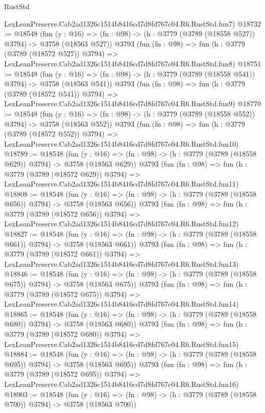\begin{lexlean}{RustStd}
\begin{coremodule}
    LexLeanPreserve.Cab2ad1326c1514b8416cd7d8fd767c04.R6.RustStd.fun7)
@18732 := @18548
    (fun (y : @16) => (fn : @98) -> (h : @3779 (@3789 (@18558 @527)) @3794) -> @3758 (@18563 @527))
    @3793
    (fun (fn : @98) =>
    fun (h : @3779 (@3789 (@18572 @527)) @3794) =>
    LexLeanPreserve.Cab2ad1326c1514b8416cd7d8fd767c04.R6.RustStd.fun8)
@18751 := @18548
    (fun (y : @16) => (fn : @98) -> (h : @3779 (@3789 (@18558 @541)) @3794) -> @3758 (@18563 @541))
    @3793
    (fun (fn : @98) =>
    fun (h : @3779 (@3789 (@18572 @541)) @3794) =>
    LexLeanPreserve.Cab2ad1326c1514b8416cd7d8fd767c04.R6.RustStd.fun9)
@18770 := @18548
    (fun (y : @16) => (fn : @98) -> (h : @3779 (@3789 (@18558 @552)) @3794) -> @3758 (@18563 @552))
    @3793
    (fun (fn : @98) =>
    fun (h : @3779 (@3789 (@18572 @552)) @3794) =>
    LexLeanPreserve.Cab2ad1326c1514b8416cd7d8fd767c04.R6.RustStd.fun10)
@18789 := @18548
    (fun (y : @16) => (fn : @98) -> (h : @3779 (@3789 (@18558 @629)) @3794) -> @3758 (@18563 @629))
    @3793
    (fun (fn : @98) =>
    fun (h : @3779 (@3789 (@18572 @629)) @3794) =>
    LexLeanPreserve.Cab2ad1326c1514b8416cd7d8fd767c04.R6.RustStd.fun11)
@18808 := @18548
    (fun (y : @16) => (fn : @98) -> (h : @3779 (@3789 (@18558 @656)) @3794) -> @3758 (@18563 @656))
    @3793
    (fun (fn : @98) =>
    fun (h : @3779 (@3789 (@18572 @656)) @3794) =>
    LexLeanPreserve.Cab2ad1326c1514b8416cd7d8fd767c04.R6.RustStd.fun12)
@18827 := @18548
    (fun (y : @16) => (fn : @98) -> (h : @3779 (@3789 (@18558 @661)) @3794) -> @3758 (@18563 @661))
    @3793
    (fun (fn : @98) =>
    fun (h : @3779 (@3789 (@18572 @661)) @3794) =>
    LexLeanPreserve.Cab2ad1326c1514b8416cd7d8fd767c04.R6.RustStd.fun13)
@18846 := @18548
    (fun (y : @16) => (fn : @98) -> (h : @3779 (@3789 (@18558 @675)) @3794) -> @3758 (@18563 @675))
    @3793
    (fun (fn : @98) =>
    fun (h : @3779 (@3789 (@18572 @675)) @3794) =>
    LexLeanPreserve.Cab2ad1326c1514b8416cd7d8fd767c04.R6.RustStd.fun14)
@18865 := @18548
    (fun (y : @16) => (fn : @98) -> (h : @3779 (@3789 (@18558 @680)) @3794) -> @3758 (@18563 @680))
    @3793
    (fun (fn : @98) =>
    fun (h : @3779 (@3789 (@18572 @680)) @3794) =>
    LexLeanPreserve.Cab2ad1326c1514b8416cd7d8fd767c04.R6.RustStd.fun15)
@18884 := @18548
    (fun (y : @16) => (fn : @98) -> (h : @3779 (@3789 (@18558 @695)) @3794) -> @3758 (@18563 @695))
    @3793
    (fun (fn : @98) =>
    fun (h : @3779 (@3789 (@18572 @695)) @3794) =>
    LexLeanPreserve.Cab2ad1326c1514b8416cd7d8fd767c04.R6.RustStd.fun16)
@18903 := @18548
    (fun (y : @16) => (fn : @98) -> (h : @3779 (@3789 (@18558 @700)) @3794) -> @3758 (@18563 @700))

\end{coremodule}
\end{lexlean}
